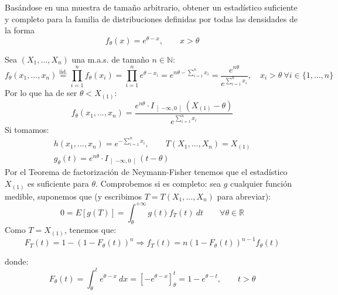 \begin{ejercicio}    %
    Basándose en una muestra de tamaño arbitrario, obtener un estadístico suficiente y completo para la familia de distribuciones definidas por todas las densidades de la forma
    \begin{equation*}
        f_\theta(x) = e^{\theta-x}, \qquad x>\theta
    \end{equation*}

    \noindent
    Sea $(X_1, \ldots, X_n)$ una m.a.s. de tamaño $n\in \mathbb{N}$: 
    \begin{equation*}
        f_{\theta}(x_1, \ldots, x_n)  \stackrel{\text{iid.}}{=} \prod_{i=1}^{n}f_\theta(x_i) = \prod_{i=1}^{n}e^{\theta - x_i} = e^{n\theta - \sum\limits_{i=1}^{n}x_i} = \dfrac{e^{n\theta}}{e^{\sum\limits_{i=1}^n x_i}}, \quad x_i > \theta\ \forall i \in \{1,\ldots,n\}
    \end{equation*}
    Por lo que ha de ser $\theta < X_{(1)}$:
    \begin{equation*}
        f_{\theta}(x_1, \ldots, x_n) = \dfrac{e^{n\theta}\cdot I_{\left]-\infty,0\right[}(X_{(1)}-\theta)}{e^{\sum\limits_{i=1}^n x_i}}
    \end{equation*}
    Si tomamos:
    \begin{gather*}
        h(x_1, \ldots, x_n) = e^{-\sum\limits_{i=1}^n x_i}, \qquad T(X_1, \ldots, X_n) = X_{(1)} \\
        g_\theta(t) = e^{n\theta}\cdot I_{\left]-\infty,0\right[}(t-\theta)
    \end{gather*}
    Por el Teorema de factorización de Neymann-Fisher tenemos que el estadístico $X_{(1)}$ es suficiente para $\theta$. Comprobemos si es completo: sea $g$ cualquier función medible, suponemos que (y escribimos $T=T(X_1, \ldots, X_n)$ para abreviar):
    \begin{equation*}
        0 = E[g(T)] = \int_{\theta}^{+\infty} g(t)f_T(t) ~dt  \qquad \forall \theta \in \mathbb{R}
    \end{equation*}
    Como $T=X_{(1)}$, tenemos que:
    \begin{equation*}
        F_T(t) = 1-{(1-F_\theta(t))}^{n} \Longrightarrow f_T(t) = n{(1-F_\theta(t))}^{n-1}f_\theta(t)
    \end{equation*}

    donde:
    \begin{equation*}
        F_\theta(t) = \int_{\theta}^{t} e^{\theta-x} ~dx  = \left[-e^{\theta-x}\right]_{\theta}^t = 1-e^{\theta-t}, \qquad t>\theta
    \end{equation*}


\end{ejercicio}
